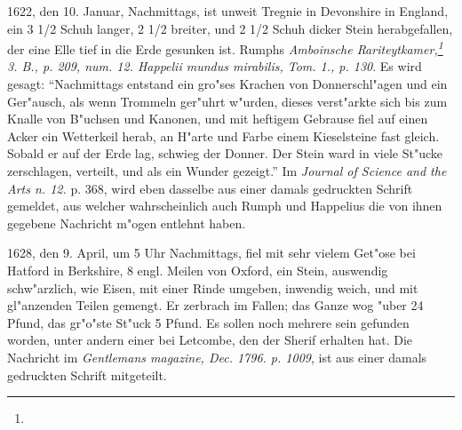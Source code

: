 \documentclass[a4paper, 11pt, oneside, polutonikogreek, german]{article}
\begin{document}
1622, den 10. Januar, Nachmittags, ist unweit Tregnie in Devonshire in England, ein 3 1/2 Schuh langer, 2 1/2 breiter, und 2 1/2 Schuh dicker Stein herabgefallen, der eine Elle tief in die Erde gesunken ist. Rumphs \emph{Amboinsche Rariteytkamer,\footnote{} 3. B., p. 209, num. 12. Happelii mundus mirabilis, Tom. 1., p. 130}. Es wird gesagt: "`Nachmittags entstand ein gro"ses Krachen von Donnerschl"agen und ein Ger"ausch, als wenn Trommeln ger"uhrt w"urden, dieses verst"arkte sich bis zum Knalle von B"uchsen und Kanonen, und mit heftigem Gebrause fiel auf einen Acker ein Wetterkeil herab, an H"arte und Farbe einem Kieselsteine fast gleich. Sobald er auf der Erde lag, schwieg der Donner. Der Stein ward in viele St"ucke zerschlagen, verteilt, und als ein Wunder gezeigt."' Im \emph{Journal of Science and the Arts n. 12.} p. 368, wird eben dasselbe aus einer damals gedruckten Schrift gemeldet, aus welcher wahrscheinlich auch Rumph und Happelius die von ihnen gegebene Nachricht m"ogen entlehnt haben.

1628, den 9. April, um 5 Uhr Nachmittags, fiel mit sehr vielem Get"ose bei Hatford in Berkshire, 8 engl. Meilen von Oxford, ein Stein, auswendig schw"arzlich, wie Eisen, mit einer Rinde umgeben, inwendig weich, und mit gl"anzenden Teilen gemengt. Er zerbrach im Fallen; das Ganze wog "uber 24 Pfund, das gr"o"ste St"uck 5 Pfund. Es sollen noch mehrere sein gefunden worden, unter andern einer bei Letcombe, den der Sherif erhalten hat. Die Nachricht im \emph{Gentlemans magazine, Dec. 1796. p. 1009}, ist aus einer damals gedruckten Schrift mitgeteilt.
\end{document}
